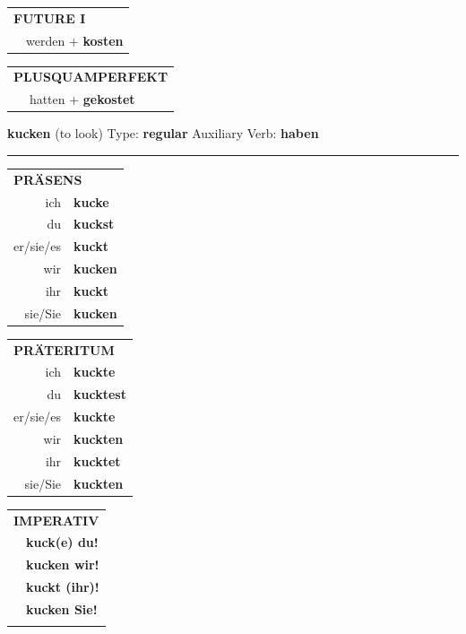 \documentclass[10pt,a4paper]{revtex4-2}
\begin{document}
\begin{verbbox-acc}
\begin{tabular}{rl}
    \multicolumn{2}{l}{\textbf{FUTURE I} }\\
   & werden + \textbf{kosten}\\
 
  \end{tabular}
\hfill
   \begin{tabular}{rl}
      \multicolumn{2}{l}{\textbf{PLUSQUAMPERFEKT}}\\
   & hatten + \textbf{gekostet}\\
  \end{tabular}
  
  \vspace{-5pt}


\end{verbbox-acc}

\begin{verbbox}
    {\Large \bf kucken} (to look) \hfill Type: \textbf{regular} \hfill Auxiliary Verb: \textbf{haben} 
    
     \vspace{5pt}

    \hrule
    
    \vspace{5pt}

  \begin{tabular}{rl}
     \multicolumn{2}{l}{\textbf{PRÄSENS} }\\
    ich & \textbf{kucke}\\
    du & \textbf{kuckst}\\
    er/sie/es & \textbf{kuckt}\\
    wir & \textbf{kucken}\\
    ihr & \textbf{kuckt}\\
    sie/Sie & \textbf{kucken}\\
  \end{tabular}
  \hfill
     \begin{tabular}{rl}
    \multicolumn{2}{l}{\textbf{PRÄTERITUM} }\\
    ich & \textbf{kuckte}\\
    du & \textbf{kucktest}\\
    er/sie/es & \textbf{kuckte}\\
    wir & \textbf{kuckten}\\
    ihr & \textbf{kucktet}\\
    sie/Sie & \textbf{kuckten}\\
  \end{tabular}
  \hfill
  \begin{tabular}{rl}
     \multicolumn{2}{l}{\textbf{IMPERATIV} }\\
   & \textbf{kuck(e) du!}\\
   & \textbf{kucken wir!}\\
   & \textbf{kuckt (ihr)!}\\
   & \textbf{kucken Sie!}\\
   & \vspace{10pt}
  \end{tabular}


\end{verbbox}
\end{document}
